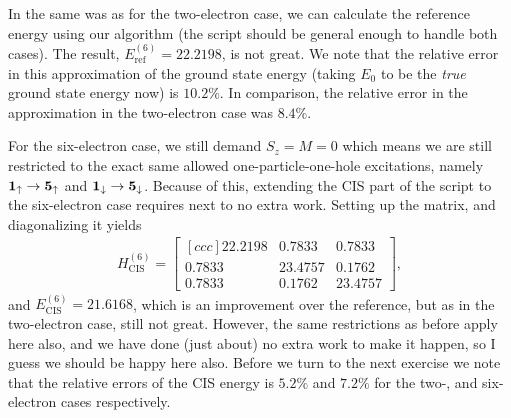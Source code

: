 \documentclass[a4paper]{article}
\newcommand{\bmat}[2]{\begin{bmatrix}[#1] #2 \end{bmatrix}}  %
\renewcommand{\u}[1]{{\bf #1}_\uparrow}
\renewcommand{\d}[1]{{\bf #1}_\downarrow}
\begin{document}
In the same was as for the two-electron case, we can calculate the reference energy using our algorithm (the script should be general enough to handle both cases). The result, $E_\text{ref}^{(6)}=22.2198$, is not great. We note that the relative error in this approximation of the ground state energy (taking $E_0$ to be the \emph{true} ground state energy now) is $10.2\%$. In comparison, the relative error in the approximation in the two-electron case was $8.4\%$. 

For the six-electron case, we still demand $S_z=M=0$ which means we are still restricted to the exact same allowed one-particle-one-hole excitations, namely $\u{1}\rightarrow \u{5}$ and $\d{1}\rightarrow\d{5}$. Because of this, extending the CIS part of the script to the six-electron case requires next to no extra work. Setting up the matrix, and diagonalizing it yields
\begin{align}
H_\text{CIS}^{(6)} = \bmat{ccc}{22.2198    & 0.7833    & 0.7833 \\
0.7833  & 23.4757   & 0.1762 \\
0.7833  &  0.1762  & 23.4757},
\end{align}
and $E_\text{CIS}^{(6)}=21.6168$, which is an improvement over the reference, but as in the two-electron case, still not great. However, the same restrictions as before apply here also, and we have done (just about) no extra work to make it happen, so I guess we should be happy here also. Before we turn to the next exercise we note that the relative errors of the CIS energy is $5.2\%$ and $7.2\%$ for the two-, and six-electron cases respectively.
\end{document}
